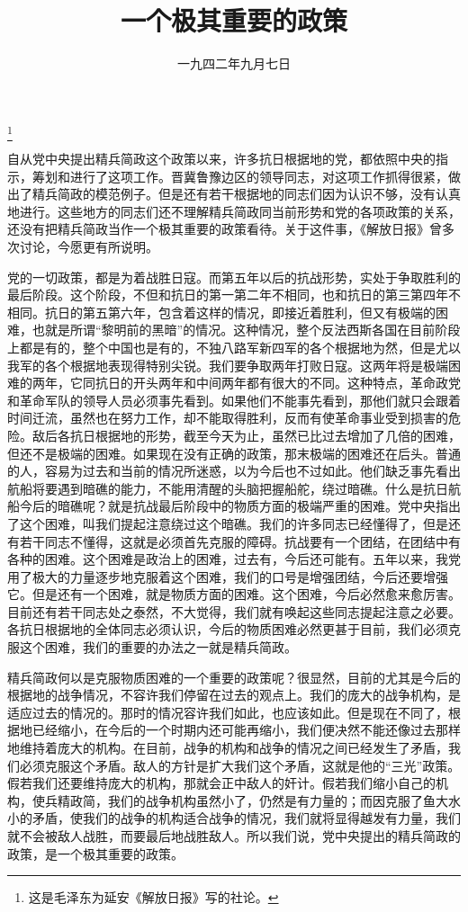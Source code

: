 
\title{一个极其重要的政策}
\date{一九四二年九月七日}
\thanks{这是毛泽东为延安《解放日报》写的社论。}
\maketitle


自从党中央提出精兵简政这个政策以来，许多抗日根据地的党，都依照中央的指示，筹划和进行了这项工作。晋冀鲁豫边区的领导同志，对这项工作抓得很紧，做出了精兵简政的模范例子。但是还有若干根据地的同志们因为认识不够，没有认真地进行。这些地方的同志们还不理解精兵简政同当前形势和党的各项政策的关系，还没有把精兵简政当作一个极其重要的政策看待。关于这件事，《解放日报》曾多次讨论，今愿更有所说明。

党的一切政策，都是为着战胜日寇。而第五年以后的抗战形势，实处于争取胜利的最后阶段。这个阶段，不但和抗日的第一第二年不相同，也和抗日的第三第四年不相同。抗日的第五第六年，包含着这样的情况，即接近着胜利，但又有极端的困难，也就是所谓“黎明前的黑暗”的情况。这种情况，整个反法西斯各国在目前阶段上都是有的，整个中国也是有的，不独八路军新四军的各个根据地为然，但是尤以我军的各个根据地表现得特别尖锐。我们要争取两年打败日寇。这两年将是极端困难的两年，它同抗日的开头两年和中间两年都有很大的不同。这种特点，革命政党和革命军队的领导人员必须事先看到。如果他们不能事先看到，那他们就只会跟着时间迁流，虽然也在努力工作，却不能取得胜利，反而有使革命事业受到损害的危险。敌后各抗日根据地的形势，截至今天为止，虽然已比过去增加了几倍的困难，但还不是极端的困难。如果现在没有正确的政策，那末极端的困难还在后头。普通的人，容易为过去和当前的情况所迷惑，以为今后也不过如此。他们缺乏事先看出航船将要遇到暗礁的能力，不能用清醒的头脑把握船舵，绕过暗礁。什么是抗日航船今后的暗礁呢？就是抗战最后阶段中的物质方面的极端严重的困难。党中央指出了这个困难，叫我们提起注意绕过这个暗礁。我们的许多同志已经懂得了，但是还有若干同志不懂得，这就是必须首先克服的障碍。抗战要有一个团结，在团结中有各种的困难。这个困难是政治上的困难，过去有，今后还可能有。五年以来，我党用了极大的力量逐步地克服着这个困难，我们的口号是增强团结，今后还要增强它。但是还有一个困难，就是物质方面的困难。这个困难，今后必然愈来愈厉害。目前还有若干同志处之泰然，不大觉得，我们就有唤起这些同志提起注意之必要。各抗日根据地的全体同志必须认识，今后的物质困难必然更甚于目前，我们必须克服这个困难，我们的重要的办法之一就是精兵简政。

精兵简政何以是克服物质困难的一个重要的政策呢？很显然，目前的尤其是今后的根据地的战争情况，不容许我们停留在过去的观点上。我们的庞大的战争机构，是适应过去的情况的。那时的情况容许我们如此，也应该如此。但是现在不同了，根据地已经缩小，在今后的一个时期内还可能再缩小，我们便决然不能还像过去那样地维持着庞大的机构。在目前，战争的机构和战争的情况之间已经发生了矛盾，我们必须克服这个矛盾。敌人的方针是扩大我们这个矛盾，这就是他的“三光”政策。假若我们还要维持庞大的机构，那就会正中敌人的奸计。假若我们缩小自己的机构，使兵精政简，我们的战争机构虽然小了，仍然是有力量的；而因克服了鱼大水小的矛盾，使我们的战争的机构适合战争的情况，我们就将显得越发有力量，我们就不会被敌人战胜，而要最后地战胜敌人。所以我们说，党中央提出的精兵简政的政策，是一个极其重要的政策。

